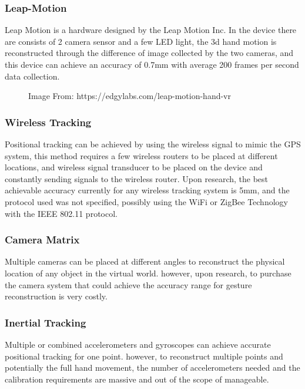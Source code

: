 \documentclass[12pt,a4paper]{report}
\begin{document}
\subsubsection{Leap-Motion}

Leap Motion is a hardware designed by the Leap Motion Inc. In the device there are consists of 2 camera sensor and a few LED light, the 3d hand motion is reconstructed through the difference of image collected by the two cameras, and this device can achieve an accuracy of 0.7mm with average 200 frames per second data collection. 

\begin{figure}[H]
    \centering
	\caption{Image From: https://edgylabs.com/leap-motion-hand-vr}
	\label{fig:full}
\end{figure}

\subsubsection{Wireless Tracking}

Positional tracking can be achieved by using the wireless signal to mimic the GPS system, this method requires a few wireless routers to be placed at different locations, and wireless signal transducer to be placed on the device and constantly sending signals to the wireless router. Upon research, the best achievable accuracy currently for any wireless tracking system is 5mm, and the protocol used was not specified, possibly using the WiFi or ZigBee Technology with the IEEE 802.11 protocol. 

\subsubsection{Camera Matrix}

Multiple cameras can be placed at different angles to reconstruct the physical location of any object in the virtual world. however, upon research, to purchase the camera system that could achieve the accuracy range for gesture reconstruction is very costly. 

\subsubsection{Inertial Tracking}

Multiple or combined accelerometers and gyroscopes can achieve accurate positional tracking for one point. however, to reconstruct multiple points and potentially the full hand movement, the number of accelerometers needed and the calibration requirements are massive and out of the scope of manageable. 
\end{document}
